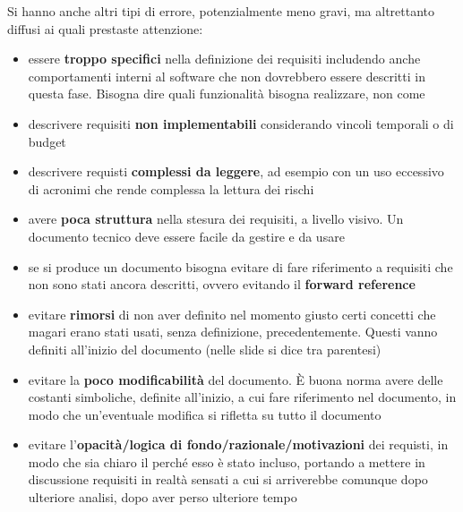 Si hanno anche altri tipi di errore, potenzialmente meno gravi, ma altrettanto diffusi ai quali prestaste attenzione:
\begin{itemize}
  \item essere \textbf{troppo specifici} nella definizione dei requisiti includendo anche comportamenti interni al software che non dovrebbero essere descritti in questa fase. Bisogna dire quali funzionalità bisogna realizzare, non come
  \item descrivere requisiti \textbf{non implementabili} considerando vincoli temporali o di budget
  \item descrivere requisti \textbf{complessi da leggere}, ad esempio con un uso eccessivo di acronimi che rende complessa la lettura dei rischi
  \item avere \textbf{poca struttura} nella stesura dei requisiti, a livello visivo. Un documento tecnico deve essere facile da gestire e da usare 
  \item se si produce un documento bisogna evitare di fare riferimento a requisiti che non sono stati ancora descritti, ovvero evitando il \textbf{forward reference}
  \item evitare \textbf{rimorsi} di non aver definito nel momento giusto certi concetti che magari erano stati usati, senza definizione, precedentemente. Questi vanno definiti all'inizio del documento (nelle slide si dice tra parentesi)
  \item evitare la \textbf{poco modificabilità} del documento. È buona norma avere delle costanti simboliche, definite all'inizio, a cui fare riferimento nel documento, in modo che un'eventuale modifica si rifletta su tutto il documento
  \item evitare l'\textbf{opacità/logica di fondo/razionale/motivazioni} dei requisti, in modo che sia chiaro il perché esso è stato incluso, portando a mettere in discussione requisiti in realtà sensati a cui si arriverebbe comunque dopo ulteriore analisi, dopo aver perso ulteriore tempo
\end{itemize}

